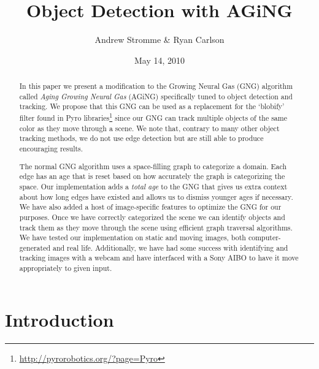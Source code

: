 \documentclass{article}
\renewcommand{\|}{\origbar} %
\begin{document}
\title{Object Detection with AGiNG}
\author{Andrew Stromme \& Ryan Carlson}
\date{May 14, 2010}
\maketitle

\begin{abstract}
  In this paper we present a modification to the Growing Neural Gas (GNG) algorithm called {\em Aging Growing Neural Gas} (AGiNG) specifically tuned to object detection and tracking. We propose that this GNG can be used as a replacement for the `blobify' filter found in Pyro libraries\footnote{\url{http://pyrorobotics.org/?page=Pyro}} since our GNG can track multiple objects of the same color as they move through a scene. We note that, contrary to many other object tracking methods, we do not use edge detection but are still able to produce encouraging results.
  
  The normal GNG algorithm uses a space-filling graph to categorize a domain. Each edge has an age that is reset based on how accurately the graph is categorizing the space. Our implementation adds a {\em total age} to the GNG that gives us extra context about how long edges have existed and allows us to dismiss younger ages if necessary. We have also added a host of image-specific features to optimize the GNG for our purposes. Once we have correctly categorized the scene we can identify objects and track them as they move through the scene using efficient graph traversal algorithms. We have tested our implementation on static and moving images, both computer-generated and real life. Additionally, we have had some success with identifying and tracking images with a webcam and have interfaced with a Sony AIBO to have it move appropriately to given input.
\end{abstract}

\section{Introduction}


\end{document}
